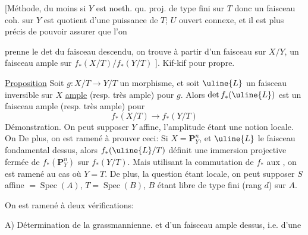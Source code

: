 [Méthode, du moins si $Y$ est noeth.   qu. proj. de type fini sur $T$ donc un faisceau coh. sur $Y$ est quotient d'une puissance de $T$; $U$ ouvert connexe, et il est plus précis de pouvoir assurer que l'on

prenne le det du faisceau descendu, on trouve à partir d'un faisceau  sur $X/Y$, un faisceau ample sur $f_*(X/T)/f_*(Y/T)$ ]. Kif-kif pour propre.

\uline{Proposition} Soit $g:X/T\longrightarrow Y/T$ un morphisme, et soit $\uline{L}$ un faisceau inversible sur $X$ \uline{ample}  (resp. très ample) pour $g$. Alors $\det f_*(\uline{L})$ est un faisceau ample (resp. très ample) pour
\[
f_*(X/T)\longrightarrow f_*(Y/T)
\]
Démonstration.  On peut supposer $Y$ affine, l'amplitude  étant une notion locale.  On    De plus, on est ramené à prouver ceci: Si $X=\mathbf P_Y^n$, et $\uline{L}$ le faisceau fondamental dessus, alors $f_*(\uline{L}/T)$  définit une immersion projective fermée de $f_*(\mathbf P_Y^n)$ sur  $f_*(Y/T)$. Mais utilisant la commutation de $f_*$ aux , on est ramené au cas où $Y=T$. De plus, la question étant locale, on peut supposer $S$ affine $=\operatorname{Spec}(A)$, $T=\operatorname{Spec}(B)$, $B$ étant libre de type fini (rang $d$) sur $A$.

On est ramené  à deux vérifications:

A) Détermination de la grassmannienne.
et d'un faisceau ample dessus, i.e. d'une 

